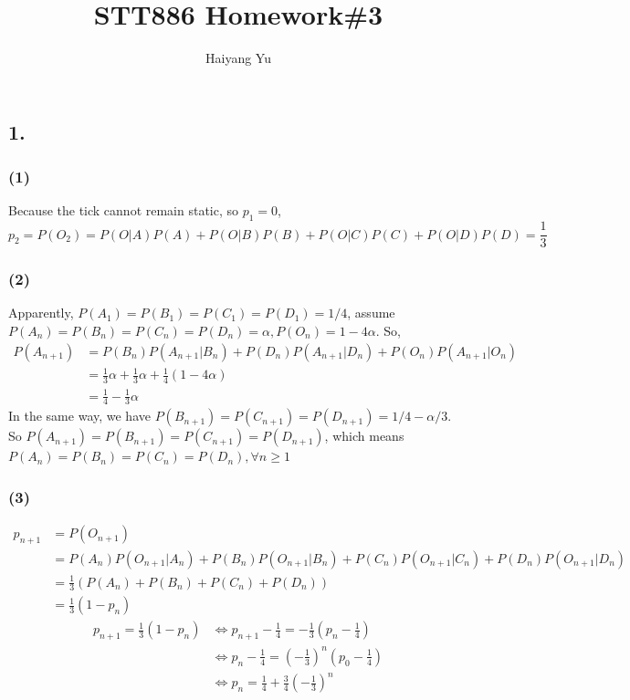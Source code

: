 \documentclass{article}
\title{STT886 Homework\#3}
\author{Haiyang Yu}
\begin{document}
\maketitle
\subsection*{1.}

\subsubsection*{(1)}
Because the tick cannot remain static, so $p_{1}=0$,
$$p_{2}=P(O_{2})=P(O|A)P(A)+P(O|B)P(B)+P(O|C)P(C)+P(O|D)P(D)=\frac{1}{3}$$

\subsubsection*{(2)}
Apparently, $P(A_{1})=P(B_{1})=P(C_{1})=P(D_{1})=1/4$, assume $P(A_{n})=P(B_{n})=P(C_{n})=P(D_{n})=\alpha, P(O_{n})=1-4\alpha$.
So, 
\begin{align*}
P(A_{n+1})&=P(B_{n})P(A_{n+1}|B_{n})+P(D_{n})P(A_{n+1}|D_{n})+P(O_{n})P(A_{n+1}|O_{n})\\
&=\frac{1}{3}\alpha+\frac{1}{3}\alpha+\frac{1}{4}(1-4\alpha)\\
&=\frac{1}{4}-\frac{1}{3}\alpha
\end{align*}
In the same way, we have $P(B_{n+1})=P(C_{n+1})=P(D_{n+1})=1/4-\alpha/3$. So $P(A_{n+1})=P(B_{n+1})=P(C_{n+1})=P(D_{n+1})$, which means $P(A_{n})=P(B_{n})=P(C_{n})=P(D_{n}), \forall n\geq1$

\subsubsection*{(3)}
\begin{align*}
p_{n+1}&=P(O_{n+1})\\
&=P(A_{n})P(O_{n+1}|A_{n})+P(B_{n})P(O_{n+1}|B_{n})+P(C_{n})P(O_{n+1}|C_{n})+P(D_{n})P(O_{n+1}|D_{n})\\
&=\frac{1}{3}\left(P(A_{n})+P(B_{n})+P(C_{n})+P(D_{n})\right)\\
&=\frac{1}{3}(1-p_{n})
\end{align*}
\begin{align*}
p_{n+1}=\frac{1}{3}(1-p_{n})&\Leftrightarrow p_{n+1}-\frac{1}{4}=-\frac{1}{3}\left(p_{n}-\frac{1}{4}\right)\\
&\Leftrightarrow p_{n}-\frac{1}{4}=\left(-\frac{1}{3}\right)^{n}\left(p_{0}-\frac{1}{4}\right)\\
&\Leftrightarrow p_{n}=\frac{1}{4}+\frac{3}{4}\left(-\frac{1}{3}\right)^{n}
\end{align*}
\end{document}
